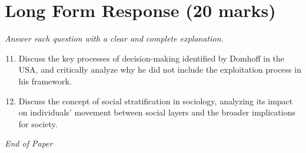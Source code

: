 \documentclass[12pt]{article}
\begin{document}
\section*{Long Form Response (20 marks)}
\textit{Answer each question with a clear and complete explanation.}
\begin{enumerate}[label=\arabic*.]
\setcounter{enumi}{10}
\item Discuss the key processes of decision-making identified by Domhoff in the USA, and critically analyze why he did not include the exploitation process in his framework.
\item Discuss the concept of social stratification in sociology, analyzing its impact on individuals' movement between social layers and the broader implications for society.
\end{enumerate}

\vfill
\noindent\textit{End of Paper}
\end{document}
